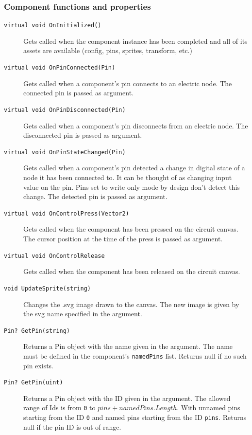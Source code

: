\subsubsection{Component functions and properties}
\begin{description}
    \item[\texttt{virtual void OnInitialized()}]
    Gets called when the component instance has been completed and all of its assets are available (config, pins, sprites, transform, etc.)

    \item[\texttt{virtual void OnPinConnected(Pin)}]
    Gets called when a component's pin connects to an electric node. The connected pin is passed as argument.

    \item[\texttt{virtual void OnPinDisconnected(Pin)}]
    Gets called when a component's pin disconnects from an electric node. The disconnected pin is passed as argument.

    \item[\texttt{virtual void OnPinStateChanged(Pin)}]
    Gets called when a component's pin detected a change in digital state of a node it has been connected to. It can be thought of as changing input value on the pin. Pins set to write only mode by design don't detect this change. The detected pin is passed as argument.

    \item[\texttt{virtual void OnControlPress(Vector2)}]
    Gets called when the component has been pressed on the circuit canvas. The cursor position at the time of the press is passed as argument.

    \item[\texttt{virtual void OnControlRelease}]
    Gets called when the component has been released on the circuit canvas.

    \item[\texttt{void UpdateSprite(string)}]
    Changes the .svg image drawn to the canvas. The new image is given by the svg name specified in the argument.

    \item[\texttt{Pin? GetPin(string)}]
    Returns a Pin object with the name given in the argument. The name must be defined in the component's \texttt{namedPins} list. Returns null if no such pin exists.

    \item[\texttt{Pin? GetPin(uint)}]
    Returns a Pin object with the ID given in the argument. The allowed range of Ids is from \texttt{0} to $pins + namedPins.Length$. With unnamed pins starting from the ID \texttt{0} and named pins starting from the ID \texttt{pins}. Returns null if the pin ID is out of range.
\end{description}

